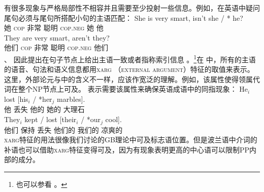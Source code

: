 有很多现象与严格局部性不相容并且需要至少投射一些信息。例如，在英语中疑问尾句必须与尾句所搭配小句的主语匹配：
\eal
\ex 
\gll She is very smart, isn't she / * he?\\
     她 \textsc{cop} 非常 聪明 \textsc{cop}.\textsc{neg} 她 {} {} 他\\
\ex 
\gll They are very smart, aren't they?\\
     他们 \textsc{cop} 非常 聪明 \textsc{cop}.\textsc{neg} 他们\\
\zl
 \citet{BF99a}、 \citet{FB2003a}因此提出在句子节点上给出主语一致或者指称索引信息 。\footnote{%
  也可以参看 。
}在 \citet{Sag2007a}中，所有的主语的语音、句法和语义信息都用\textsc{xarg} （\textsc{external argument}）特征的取值来表示。这里，外部论元与\gbtc 中的含义不一样，应该作宽泛的理解。例如，该属性使得领属代词在整个NP节点上可及。 \citet{Sag2007a}表示需要该属性来确保英语成语中的同指现象：
\eal
\ex 
\gll He$_i$ lost [his$_i$ / *her$_j$ marbles].\\
     他      丢失 \spacebr{}他的 {} 她的 大理石\\
\ex 
\gll They$_i$ kept / lost [their$_i$ / *our$_j$ cool].\\
     他们     保持  {} 丢失 \spacebr{}他们的 {} 我们的 凉爽的\\
\zl
\textsc{xarg}特征的用法很像我们讨论的GB理论中可及标志语位置。但是波兰语中介词的补语也可以借助\textsc{xarg}特征变得可及，因为有现象表明更高的中心语可以限制PP内部的成分\citep[\S~5.4.1.2]{Prze99b}。

